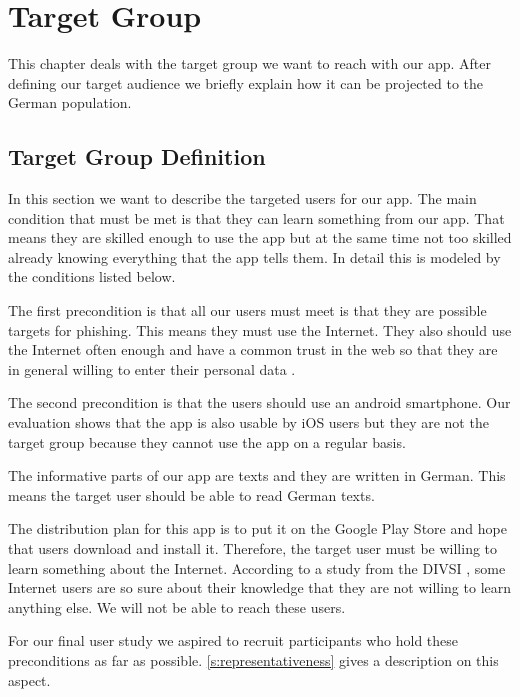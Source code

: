 \section{Target Group}
\label{s:target_group}
This chapter deals with the target group we want to reach with our app.
After defining our target audience we briefly explain how it can be projected to the German population.

\subsection{Target Group Definition}
\label{s:target_group_def}
In this section we want to describe the targeted users for our app.
The main condition that must be met is that they can learn something from our app.
That means they are skilled enough to use the app but at the same time not too skilled already knowing everything that the app tells them.
In detail this is modeled by the conditions listed below.
\begin{description}[leftmargin=0cm]
\item[Attackability:] The first precondition is that all our users must meet is that they are possible targets for phishing.
This means they must use the Internet.
They also should use the Internet often enough and have a common trust in the web so that they are in general willing to enter their personal data \cite{divsi2012divsi}.
\item[Android Users:] The second precondition is that the users should use an android smartphone.
Our evaluation shows that the app is also usable by iOS users but they are not the target group because they cannot use the app on a regular basis.
\item[Language:] The informative parts of our app are texts and they are written in German.
This means the target user should be able to read German texts.
\item[Motivation:] The distribution plan for this app is to put it on the Google Play Store and hope that users download and install it.
Therefore, the target user must be willing to learn something about the Internet. According to a study from the DIVSI \cite{divsi2012divsi}, some Internet users are so sure about their knowledge that they are not willing to learn anything else.
We will not be able to reach these users.
\end{description}

For our final user study we aspired to recruit participants who hold these preconditions as far as possible.
\autoref{s:representativeness} gives a description on this aspect.

